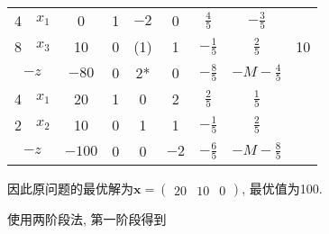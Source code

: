 \begin{table}[ht]
\begin{tabular}{|c|c|c|c|c|c|c|c|c|}
        \hline

        4 & $x_1$ & 0 & \multicolumn{1}{c}{1} & \multicolumn{1}{c}{\cellcolor{LightBlue1}$-2$} & \multicolumn{1}{c}{0} & \multicolumn{1}{c}{$\tfrac{4}{5}$} & $-\tfrac{3}{5}$ & \\
        \cline{1-3}
        8 & {\color{red}$x_3$} & 10 & \multicolumn{1}{c}{0} & \multicolumn{1}{c}{\cellcolor{LightBlue1}\color{red}(1)} & \multicolumn{1}{c}{1} & \multicolumn{1}{c}{$-\tfrac{1}{5}$} & $\tfrac{2}{5}$ & {\color{red}10} \\
        \hline
        \multicolumn{2}{|c|}{$-z$} & $-80$ & \multicolumn{1}{c}{0} & \multicolumn{1}{c}{\cellcolor{LightBlue1}\color{red}2*} & \multicolumn{1}{c}{0} & \multicolumn{1}{c}{$-\tfrac{8}{5}$} & $-M-\tfrac{4}{5}$ & \\

        \hline

        4 & $x_1$ & 20 & \multicolumn{1}{c}{1} & \multicolumn{1}{c}{0} & \multicolumn{1}{c}{2} & \multicolumn{1}{c}{$\tfrac{2}{5}$} & $\tfrac{1}{5}$ & \\
        \cline{1-3}
        2 & $x_2$ & 10 & \multicolumn{1}{c}{0} & \multicolumn{1}{c}{1} & \multicolumn{1}{c}{1} & \multicolumn{1}{c}{$-\tfrac{1}{5}$} & $\tfrac{2}{5}$ & \\
        \hline
        \multicolumn{2}{|c|}{$-z$} & $-100$ & \multicolumn{1}{c}{0} & \multicolumn{1}{c}{0} & \multicolumn{1}{c}{$-2$} & \multicolumn{1}{c}{$-\tfrac{6}{5}$} & $-M-\tfrac{8}{5}$ & \\

        \hline
    \end{tabular}
\end{table}
因此原问题的最优解为$\bm{x}=\begin{pmatrix}20 & 10 & 0\end{pmatrix}$, 最优值为100.

使用两阶段法, 第一阶段得到

